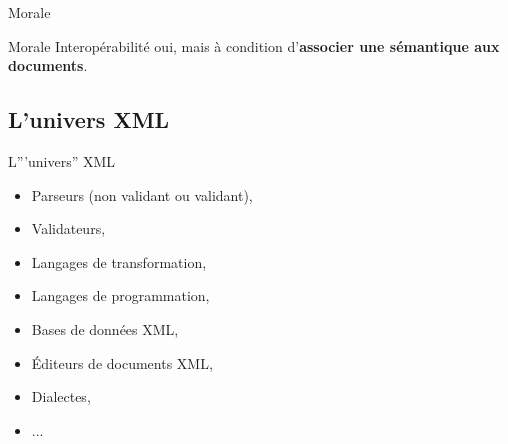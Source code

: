 \begin{frame}[containsverbatim]{Morale}

\begin{alertblock}{Morale}
Interop\'erabilit\'e oui, mais \`a condition d'\textbf{associer une s\'emantique aux documents}.
\end{alertblock}

\end{frame}



\subsection{L'univers XML}

\begin{frame}{L'''univers'' XML}

\begin{itemize}
\item Parseurs (non validant ou validant),
\item Validateurs,
\item Langages de transformation,
\item Langages de programmation,
\item Bases de donn\'ees XML,
\item \'Editeurs de documents XML,
\item Dialectes,
\item ...
\end{itemize}


\end{frame}


